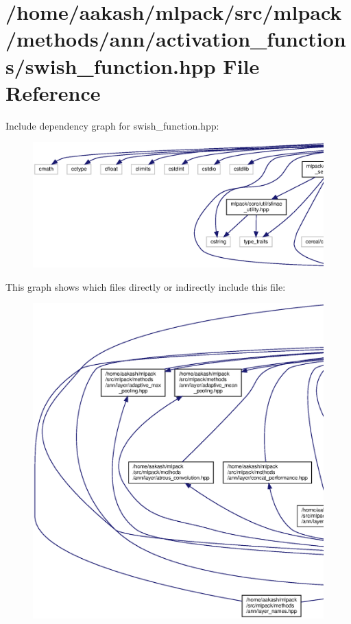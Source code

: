 \section{/home/aakash/mlpack/src/mlpack/methods/ann/activation\+\_\+functions/swish\+\_\+function.hpp File Reference}
\label{swish__function_8hpp}
Include dependency graph for swish\+\_\+function.\+hpp\+:
\nopagebreak
\begin{figure}[H]
\begin{center}
\leavevmode
\includegraphics[width=350pt]{swish__function_8hpp__incl}
\end{center}
\end{figure}
This graph shows which files directly or indirectly include this file\+:
\nopagebreak
\begin{figure}[H]
\begin{center}
\leavevmode
\includegraphics[width=350pt]{swish__function_8hpp__dep__incl}
\end{center}
\end{figure}
